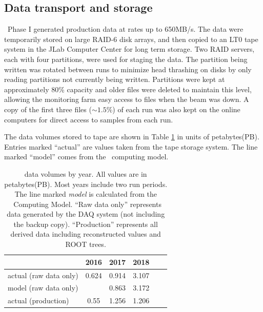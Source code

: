 \subsection{Data transport and storage \label{sec:onlineprocessing}}

\GX ~Phase I generated production data at rates up to 650MB/s. The data were temporarily stored on large RAID-6 disk arrays, and then copied to an LT0 tape system in the JLab Computer Center for long term storage. Two RAID servers, each with four partitions, were used for staging the data. The partition being written was rotated between runs  to minimize head thrashing on disks by only reading partitions not currently being written. Partitions were kept at approximately 80\% capacity and older files were deleted to maintain this level,  allowing the monitoring farm easy access to files when the beam was down. A copy of the first three files ($\sim1.5\%$) of each run was also kept on the online computers for direct access to samples from each run.      

The data volumes stored to tape are shown in Table \ref{tab:online_data_volumes} in units of petabytes(PB). Entries marked ``actual'' are values taken from the tape storage system. The line marked ``model'' comes from the \GX ~computing model\cite{gx3821}.

\begin{table}[tb]
    \centering
    \begin{tabular}{|l|c|c|c|c|c|}
    \hline
                           & \textbf{2016}  & \textbf{2017}  & \textbf{2018} \\
    \hline
    actual (raw data only) & 0.624 & 0.914 & 3.107 \\
    \hline
     model (raw data only) &       & 0.863 & 3.172 \\
    \hline
    \hline
    actual (production)    & 0.55  & 1.256 & 1.206 \\
    \hline
    \end{tabular}
    \caption{\GX{} data volumes by year. All values are in petabytes(PB). Most years include two run periods. The line marked \textit{model} is calculated from the \GX ~Computing Model\cite{gx3821}. ``Raw data only'' represents data generated by the DAQ system (not including the backup copy). ``Production'' represents all derived data including reconstructed values and ROOT trees. }
    \label{tab:online_data_volumes}
\end{table}

